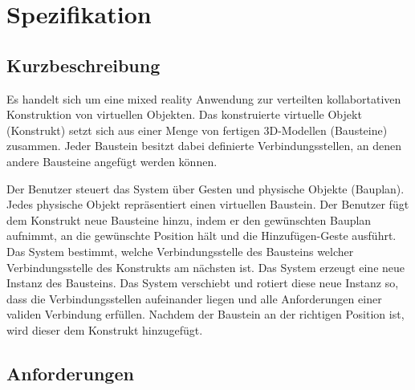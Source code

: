 \section{Spezifikation}

\subsection{Kurzbeschreibung}

Es handelt sich um eine mixed reality Anwendung zur verteilten kollabortativen Konstruktion von virtuellen Objekten. Das konstruierte virtuelle Objekt (Konstrukt) setzt sich aus einer Menge von fertigen 3D-Modellen (Bausteine) zusammen. Jeder Baustein besitzt dabei definierte Verbindungsstellen, an denen andere Bausteine angefügt werden können.

Der Benutzer steuert das System über Gesten und physische Objekte (Bauplan). Jedes physische Objekt repräsentiert einen virtuellen Baustein. Der Benutzer fügt dem Konstrukt neue Bausteine hinzu, indem er den gewünschten Bauplan aufnimmt, an die gewünschte Position hält und die Hinzufügen-Geste ausführt.
Das System bestimmt, welche Verbindungsstelle des Bausteins welcher Verbindungsstelle des Konstrukts am nächsten ist. Das System erzeugt eine neue Instanz des Bausteins. Das System verschiebt und rotiert diese neue Instanz so, dass die Verbindungsstellen aufeinander liegen und alle Anforderungen einer validen Verbindung erfüllen. Nachdem der Baustein an der richtigen Position ist, wird dieser dem Konstrukt hinzugefügt.

\subsection{Anforderungen}

